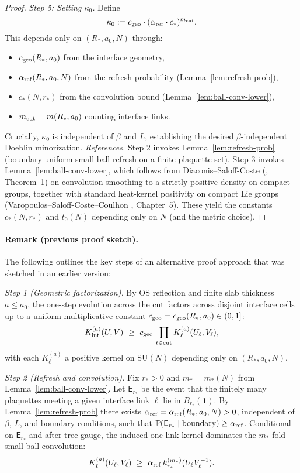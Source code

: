 \documentclass[11pt]{amsart}
\begin{document}
\begin{proof}
\emph{Step 5: Setting $\kappa_0$.} Define
\[
  \kappa_0 := c_{\rm geo} \cdot (\alpha_{\rm ref} \cdot c_*)^{m_{\rm cut}}.
\]
This depends only on $(R_*,a_0,N)$ through:
\begin{itemize}
  \item $c_{\rm geo}(R_*,a_0)$ from the interface geometry,
  \item $\alpha_{\rm ref}(R_*,a_0,N)$ from the refresh probability (Lemma~\ref{lem:refresh-prob}),
  \item $c_*(N,r_*)$ from the convolution bound (Lemma~\ref{lem:ball-conv-lower}),
  \item $m_{\rm cut} = m(R_*,a_0)$ counting interface links.
\end{itemize}
Crucially, $\kappa_0$ is independent of $\beta$ and $L$, establishing the desired $\beta$-independent Doeblin minorization.
\smallskip
\noindent\emph{References.} Step 2 invokes Lemma~\ref{lem:refresh-prob} (boundary-uniform small-ball refresh on a finite plaquette set). Step 3 invokes Lemma~\ref{lem:ball-conv-lower}, which follows from Diaconis--Saloff-Coste (\cite{DiaconisSaloffCoste2004}, Theorem~1) on convolution smoothing to a strictly positive density on compact groups, together with standard heat-kernel positivity on compact Lie groups (Varopoulos--Saloff-Coste--Coulhon \cite{VaropoulosSaloffCosteCoulhon1992}, Chapter~5). These yield the constants $c_*(N,r_*)$ and $t_0(N)$ depending only on $N$ (and the metric choice).\par
\end{proof}

\paragraph{Remark (previous proof sketch).} The following outlines the key steps of an alternative proof approach that was sketched in an earlier version:

\emph{Step 1 (Geometric factorization).} By OS reflection and finite slab thickness $a\le a_0$, the one-step evolution across the cut factors across disjoint interface cells up to a uniform multiplicative constant $c_{\rm geo}=c_{\rm geo}(R_*,a_0)\in(0,1]$:
\[
  K_{\rm int}^{(a)}(U,V)\ \ge\ c_{\rm geo}\,\prod_{\ell\in\mathrm{cut}} K_\ell^{(a)}(U_\ell,V_\ell),
\]
with each $K_\ell^{(a)}$ a positive kernel on $\mathrm{SU}(N)$ depending only on $(R_*,a_0,N)$.

\emph{Step 2 (Refresh and convolution).} Fix $r_*>0$ and $m_*=m_*(N)$ from Lemma~\ref{lem:ball-conv-lower}. Let $\mathsf E_{r_*}$ be the event that the finitely many plaquettes meeting a given interface link $\ell$ lie in $B_{r_*}(\mathbf 1)$. By Lemma~\ref{lem:refresh-prob} there exists $\alpha_{\rm ref}=\alpha_{\rm ref}(R_*,a_0,N)>0$, independent of $\beta$, $L$, and boundary conditions, such that $\mathbb P(\mathsf E_{r_*}\mid \text{boundary})\ge \alpha_{\rm ref}$. Conditional on $\mathsf E_{r_*}$ and after tree gauge, the induced one-link kernel dominates the $m_*$-fold small-ball convolution:
\[
  K_\ell^{(a)}(U_\ell,V_\ell)\ \ge\ \alpha_{\rm ref}\,k_{r_*}^{(m_*)}(U_\ell V_\ell^{-1}).
\]
\end{document}
